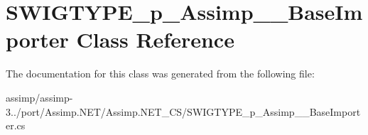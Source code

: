 \hypertarget{class_s_w_i_g_t_y_p_e__p___assimp_____base_importer}{\section{S\+W\+I\+G\+T\+Y\+P\+E\+\_\+p\+\_\+\+Assimp\+\_\+\+\_\+\+Base\+Importer Class Reference}
\label{class_s_w_i_g_t_y_p_e__p___assimp_____base_importer}
}


The documentation for this class was generated from the following file\+:\begin{DoxyCompactItemize}
\item 
assimp/assimp-\/3../port/\+Assimp.\+N\+E\+T/\+Assimp.\+N\+E\+T\+\_\+\+C\+S/S\+W\+I\+G\+T\+Y\+P\+E\+\_\+p\+\_\+\+Assimp\+\_\+\+\_\+\+Base\+Importer.\+cs\end{DoxyCompactItemize}
